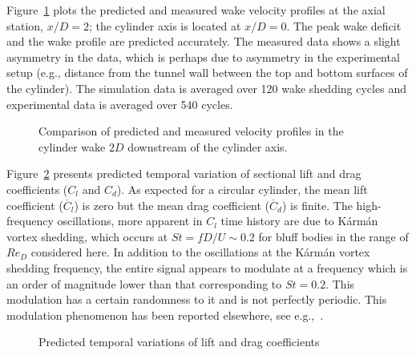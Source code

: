 Figure~\ref{fig:velocity_Normal_Re20k} plots the predicted and measured wake
velocity profiles at the axial station, $x/D=2$; the cylinder axis is located
at $x/D=0$. The peak wake deficit and the wake profile are predicted
accurately. The measured data shows a slight asymmetry in the data, which is
perhaps due to asymmetry in the experimental setup (e.g., distance from the
tunnel wall between the top and bottom surfaces of the cylinder). The
simulation data is averaged over 120 wake shedding cycles and experimental data
is averaged over 540 cycles.
%
\begin{figure}[htb!]
  \caption{Comparison of predicted and measured velocity profiles in the
    cylinder wake $2D$ downstream of the cylinder axis.}
  \label{fig:velocity_Normal_Re20k}
\end{figure}

Figure~\ref{fig:force_20k} presents predicted temporal variation of sectional
lift and drag coefficients ($C_l$ and $C_d$). As expected for a circular
cylinder, the mean lift coefficient ($\overline{C}_l$) is zero but the mean
drag coefficient ($\overline{C}_d$) is finite. The high-frequency oscillations,
more apparent in $C_l$ time history are due to K\'arm\'an vortex shedding, which
occurs at $St=fD/U \sim 0.2$ for bluff bodies in the range of $Re_D$ considered
here. In addition to the oscillations at the K\'arm\'an vortex shedding frequency,
the entire signal appears to modulate at a frequency which is an order of
magnitude lower than that corresponding to $St=0.2$. This modulation has a
certain randomness to it and is not perfectly periodic. This modulation
phenomenon has been reported elsewhere, see e.g.,~\cite{travin2000detached}. 
%
\begin{figure}[htb!]
  \caption{Predicted temporal variations of lift and drag coefficients}
  \label{fig:force_20k}
\end{figure}

